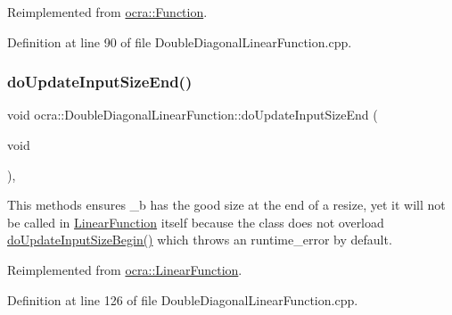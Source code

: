 Reimplemented from \hyperlink{classocra_1_1Function_a3f728f3758e6448aa59932853db5ddcc}{ocra\+::\+Function}.



Definition at line 90 of file Double\+Diagonal\+Linear\+Function.\+cpp.

\hypertarget{classocra_1_1DoubleDiagonalLinearFunction_a89070f8f2b068d8b6b3e216433e50538}{}\label{classocra_1_1DoubleDiagonalLinearFunction_a89070f8f2b068d8b6b3e216433e50538} 
\subsubsection{\texorpdfstring{do\+Update\+Input\+Size\+End()}{doUpdateInputSizeEnd()}}
{\footnotesize\ttfamily void ocra\+::\+Double\+Diagonal\+Linear\+Function\+::do\+Update\+Input\+Size\+End (\begin{DoxyParamCaption}\item[{void}]{ }\end{DoxyParamCaption})\hspace{0.3cm}{\ttfamily [protected]}, {\ttfamily [virtual]}}

This methods ensures \+\_\+b has the good size at the end of a resize, yet it will not be called in \hyperlink{classocra_1_1LinearFunction}{Linear\+Function} itself because the class does not overload \hyperlink{classocra_1_1DoubleDiagonalLinearFunction_a91fd529bf34bffd327fcd545035bec67}{do\+Update\+Input\+Size\+Begin()} which throws an runtime\+\_\+error by default. 

Reimplemented from \hyperlink{classocra_1_1LinearFunction_ac6bdf62ad6634397778d5f4223ed6d82}{ocra\+::\+Linear\+Function}.



Definition at line 126 of file Double\+Diagonal\+Linear\+Function.\+cpp.

\hypertarget{classocra_1_1DoubleDiagonalLinearFunction_a51c22f2f4a7ae45bf61d5ee36345acb4}{}\label{classocra_1_1DoubleDiagonalLinearFunction_a51c22f2f4a7ae45bf61d5ee36345acb4} 
